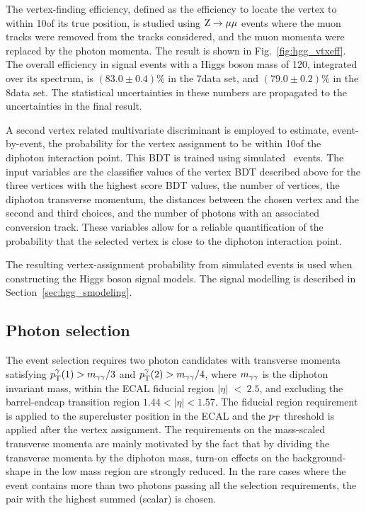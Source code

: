 \documentclass[12pt,twoside,a4paper,cmspaper,final,collab]{cms-tdr}
\begin{document}
The vertex-finding efficiency, defined as the efficiency to locate the vertex to
within 10\mm of its true position, is studied using $\mathrm{Z}\to\mu\mu$
events where the muon tracks were removed from the tracks considered,
and the muon momenta were replaced by the photon momenta.
The result
is shown in Fig.~\ref{fig:hgg_vtxeff}. The overall efficiency in signal events
with a Higgs boson mass of 120\GeV, integrated over its \pt spectrum, is
$(83.0\pm0.4)\%$ in the 7\TeV data set, and
$(79.0\pm0.2)\%$ in the 8\TeV data set. The statistical uncertainties in
these numbers are propagated to the uncertainties in the final result.

A second vertex related multivariate discriminant is employed to
estimate, event-by-event, the probability for the vertex
assignment to be within 10\mm of the diphoton interaction point.
This BDT is trained using simulated \HGG\ events. The input variables are
the classifier values of the vertex BDT described above for the three vertices with the highest score BDT values,
the number of vertices, the diphoton transverse momentum,
the distances between the chosen vertex and the second and third choices,
and the number of photons with an associated conversion track.
These variables allow for a reliable quantification of the probability
that the selected vertex is close to the diphoton interaction point.

The resulting  vertex-assignment probability from simulated events is used when constructing the Higgs boson signal models.
The signal modelling is described in Section~\ref{sec:hgg_smodeling}.

\subsection{Photon selection}
\label{sec:hgg_selection}

The event selection requires two photon candidates with transverse momenta satisfying
$p_{\mathrm{T}}^{\gamma}(1) > m_{\gamma\gamma}/3$ and $p_{\mathrm{T}}^{\gamma}(2) > m_{\gamma\gamma}/4$, where $m_{\gamma\gamma}$ is the diphoton invariant mass,
within the ECAL fiducial region $|\eta|$ $<~2.5$, and excluding the
barrel-endcap transition region $1.44 < |\eta| < 1.57$.
The fiducial region requirement  is applied to the supercluster position in the ECAL
and the $p_{\mathrm{T}}$ threshold is applied after the vertex assignment.
The requirements on the mass-scaled transverse momenta are mainly motivated by the fact
that by dividing the transverse momenta by the diphoton mass,
turn-on effects on the background-shape in the low mass region are strongly reduced.
In the rare cases where the event contains more than two photons
passing all the selection requirements, the pair with the highest summed
(scalar) \pt is chosen.
\end{document}
